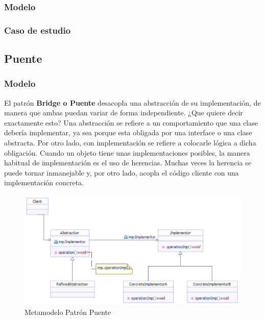 \subsubsection{Modelo}
\newpage
\subsubsection{Caso de estudio}
\newpage


\subsection{Puente}
	
\subsubsection{Modelo}

El patrón \textbf{Bridge o Puente} desacopla una abstracción de su implementación, de manera que ambas puedan variar de forma independiente. ¿Que quiere decir exactamente esto? Una abstracción se refiere a un comportamiento que una clase debería implementar, ya sea porque esta obligada por una interface o una clase abstracta. Por otro lado, con implementación se refiere a colocarle lógica a dicha obligación. Cuando un objeto tiene unas implementaciones posibles, la manera habitual de implementación es el uso de herencias. Muchas veces la herencia se puede tornar inmanejable y, por otro lado, acopla el código cliente con una implementación concreta. 

\begin{figure}[th!]
	\centering
	\includegraphics[width=1\linewidth]{arquitectura/imagenes/modeloPuente}
	\caption{Metamodelo Patrón Puente}
	\label{fig:metamodelo puente}
\end{figure}

